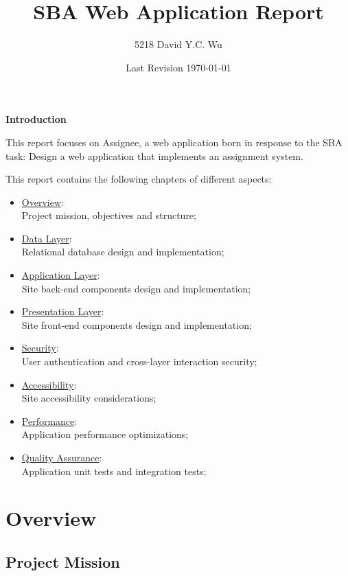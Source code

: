\documentclass[12pt]{report}
\title{SBA Web Application Report}
\author{5218 David Y.C. Wu}
\date{Last Revision \today}
\begin{document}
\maketitle

\textbf{Introduction}
\vspace{1 em}

This report focuses on Assignee, a web application born in response to the SBA task: Design a web application that implements an assignment system.
\vspace{1 em}

This report contains the following chapters of different aspects:
\begin{itemize}
	\item \hyperref[ch:overview]{Overview}:\\
	      Project mission, objectives and structure;
	\item \hyperref[ch:data-layer]{Data Layer}:\\
	      Relational database design and implementation;
	\item \hyperref[ch:application-layer]{Application Layer}:\\
	      Site back-end components design and implementation;
	\item \hyperref[ch:presentation-layer]{Presentation Layer}:\\
	      Site front-end components design and implementation;
	\item \hyperref[ch:security]{Security}:\\
	      User authentication and cross-layer interaction security;
	\item \hyperref[ch:accessibility]{Accessibility}:\\
	      Site accessibility considerations;
	\item \hyperref[ch:performance]{Performance}:\\
	      Application performance optimizations;
	\item \hyperref[ch:quality-assurance]{Quality Assurance}:\\
	      Application unit tests and integration tests;
\end{itemize}

\tableofcontents
\newpage

\chapter{Overview} \label{ch:overview}

\section{Project Mission} \label{se:project-mission}
\end{document}
